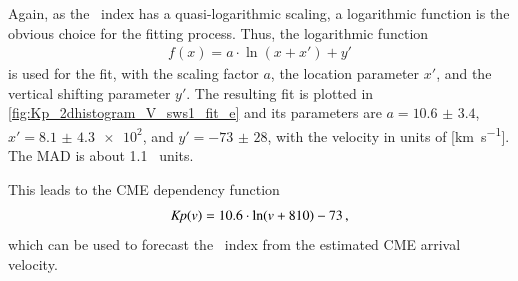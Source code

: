 Again, as the \Kp~index has a quasi-logarithmic scaling, a logarithmic function is the obvious choice for the fitting process. Thus, the logarithmic function
\begin{align}
	f(x) = a \cdot \ln\left(x + x'\right) + y'	\label{eq:log_offset_fit_function}
\end{align}
is used for the fit, with the scaling factor $a$, the location parameter $x'$, and the vertical shifting parameter $y'$. The resulting fit is plotted in \autoref{fig:Kp_2dhistogram_V_sws1_fit_e} and its parameters are $a = \num{10.6(34)}$, $x' = \num{8.1(43)e2}$, and $y' = \num{-73(28)}$, with the velocity in units of [\si{\km\per\s}]. The MAD is about 1.1~\Kp{} units.
\begin{figure}
\end{figure}
This leads to the CME dependency function
\begin{align}
	\textit{Kp}(v) = 10.6 \cdot \ln(v + 810) - 73	\,,	\label{eq:kpvsv_CME_dependency_function}
\end{align}
which can be used to forecast the \Kp{}~index from the estimated CME arrival velocity.\\


